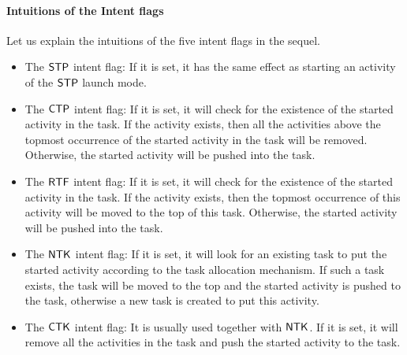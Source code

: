 \paragraph{Intuitions of the Intent flags}  Let us explain the intuitions of the five intent flags in the sequel. 
\begin{itemize}
	\item The ${\sf STP}$ intent flag:  If it is set,  it has the same effect as starting an activity of the $\mathsf{STP}$ launch mode.
	\item The ${\sf CTP}$ intent flag:  If it is set, it will check for the existence of the started activity in the task. If the activity exists, then all the activities above the topmost occurrence of the started activity in the task will be removed. Otherwise, the started activity will be pushed into the task.
	\item The ${\sf RTF}$ intent flag:  If it is set, it will check for the existence of the started activity in the task. If the activity exists, then the topmost occurrence of this activity will be moved to the top of this task. Otherwise, the started activity will be pushed into the task.
	\item The ${\sf NTK}$ intent flag:  If it is set, it will look for an existing task to put the started activity according to the task allocation mechanism. If such a task exists, the task will be moved to the top and the started activity is pushed to the task, otherwise a new task is created to put this activity.
	\item The ${\sf CTK}$ intent flag:  It is usually used together with ${\sf NTK}$. If it is set, it will remove all the activities in the task and push the started activity to the task.
\end{itemize}


